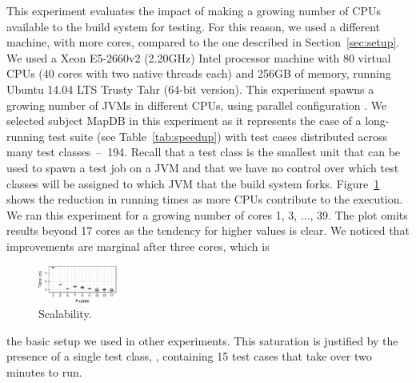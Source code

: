 \newcommand{\subjectScalability}{MapDB}

This experiment evaluates the impact of making a growing number of
CPUs available to the build system for testing.  For this reason, we
used a different machine, with more cores, compared to the one described in
Section~\ref{sec:setup}.  We used a Xeon E5-2660v2 (2.20GHz) Intel
processor machine with 80 virtual CPUs (40 cores with two native
threads each) and 256GB of memory, running Ubuntu 14.04 LTS Trusty
Tahr (64-bit version). This experiment
spawns a growing number of JVMs in different CPUs, using parallel
configuration \emph{\ForkSeq{}}. We selected
subject \subjectScalability{} in this experiment as it represents the
case of a long-running test suite (see Table~\ref{tab:speedup}) with
test cases distributed across many test classes~--~194.  
Recall that a test class is the smallest unit that can be used to spawn a test job
on a JVM and that we have no control over which test classes will be
assigned to which JVM that the build system forks.
Figure~\ref{fig:scalability} shows the reduction in running times as
more CPUs contribute to the execution.
We ran this experiment for a growing number of cores 1, 3, ..., 39. 
The plot omits results beyond 17 cores as the tendency for higher
values is clear.
We noticed that improvements are marginal after three cores, which is
\begin{figure}
  \vspace{-1ex}
  \includegraphics[width=0.23\textwidth]{R/scalability/scalability.pdf}
  \caption{\label{fig:scalability}Scalability.}
  \vspace{-2ex}
\end{figure}
the basic setup we used in other experiments.
This saturation is justified by the presence of a single test class,
, containing 15 test cases that take over
two minutes to run.

\begin{center}
\vspace{1ex}
\end{center}

